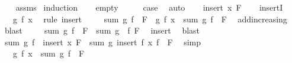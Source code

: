 \begin{isabellebody}
%
\isadelimproof
\ \ %
\endisadelimproof
%
\isatagproof
{}\isamarkupfalse%
\ assms\isanewline
{}\isamarkupfalse%
\ induction\isanewline
\ \ \isamarkupfalse%
\ empty\isanewline
\ \ \isamarkupfalse%
\ \isamarkupfalse%
\ {\isacharquery}{\kern0pt}case\ \isamarkupfalse%
\ auto\isanewline
{}\isamarkupfalse%
\isanewline
\ \ \isamarkupfalse%
\ {\isacharparenleft}{\kern0pt}insert\ x\ F{\isacharparenright}{\kern0pt}\isanewline
\ \ \isamarkupfalse%
\ insertI{}\ \isamarkupfalse%
\ {\isachardoublequoteopen}{}\ {\isasymle}\ g\ {\isacharparenleft}{\kern0pt}f\ x{\isacharparenright}{\kern0pt}{\isachardoublequoteclose}\ \isamarkupfalse%
\ {\isacharparenleft}{\kern0pt}rule\ insert{\isacharparenright}{\kern0pt}\isanewline
\ \ \isamarkupfalse%
\ {}{\isacharcolon}{\kern0pt}\ {\isachardoublequoteopen}sum\ g\ {\isacharparenleft}{\kern0pt}f\ {\isacharbackquote}{\kern0pt}\ F{\isacharparenright}{\kern0pt}\ {\isasymle}\ g\ {\isacharparenleft}{\kern0pt}f\ x{\isacharparenright}{\kern0pt}\ {\isacharplus}{\kern0pt}\ sum\ g\ {\isacharparenleft}{\kern0pt}f\ {\isacharbackquote}{\kern0pt}\ F{\isacharparenright}{\kern0pt}{\isachardoublequoteclose}\ \isamarkupfalse%
\ add{\isacharunderscore}{\kern0pt}increasing\ \isamarkupfalse%
\ blast\isanewline
\ \ \isamarkupfalse%
\ {}{\isacharcolon}{\kern0pt}\ {\isachardoublequoteopen}sum\ g\ {\isacharparenleft}{\kern0pt}f\ {\isacharbackquote}{\kern0pt}\ F{\isacharparenright}{\kern0pt}\ {\isasymle}\ sum\ {\isacharparenleft}{\kern0pt}g\ {\isasymcirc}\ f{\isacharparenright}{\kern0pt}\ F{\isachardoublequoteclose}\ \isamarkupfalse%
\ insert\ \isamarkupfalse%
\ blast\isanewline
\ \ \isamarkupfalse%
\ {\isachardoublequoteopen}sum\ g\ {\isacharparenleft}{\kern0pt}f\ {\isacharbackquote}{\kern0pt}\ insert\ x\ F{\isacharparenright}{\kern0pt}\ {\isacharequal}{\kern0pt}\ sum\ g\ {\isacharparenleft}{\kern0pt}insert\ {\isacharparenleft}{\kern0pt}f\ x{\isacharparenright}{\kern0pt}\ {\isacharparenleft}{\kern0pt}f\ {\isacharbackquote}{\kern0pt}\ F{\isacharparenright}{\kern0pt}{\isacharparenright}{\kern0pt}{\isachardoublequoteclose}\ \isamarkupfalse%
\ simp\isanewline
\ \ \isamarkupfalse%
\ \isamarkupfalse%
\ {\isachardoublequoteopen}{\isasymdots}\ {\isasymle}\ g\ {\isacharparenleft}{\kern0pt}f\ x{\isacharparenright}{\kern0pt}\ {\isacharplus}{\kern0pt}\ sum\ g\ {\isacharparenleft}{\kern0pt}f\ {\isacharbackquote}{\kern0pt}\ F{\isacharparenright}{\kern0pt}{\isachardoublequoteclose}\ \isamarkupfalse%

\end{isabellebody}
